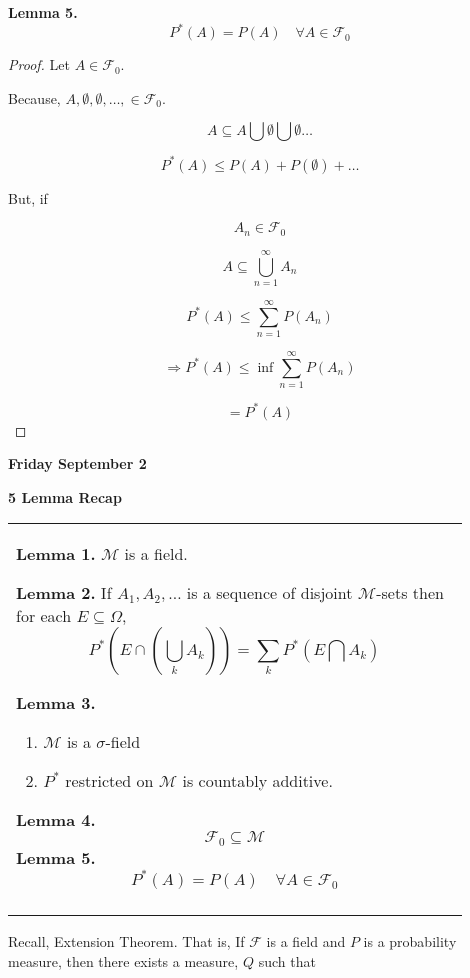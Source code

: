 \documentclass[11pt,fleqn]{book} %
\begin{document}
\textbf{Lemma 5.}$$P^*(A) = P(A) \quad \forall A \in \mathcal{F}_0$$

\begin{proof}
	Let $A \in \mathcal{F}_0$. 

	Because,  $A, \emptyset, \emptyset, \dots, \in \mathcal{F}_0$. 

	$$A \subseteq A \bigcup \emptyset \bigcup \emptyset \dots $$

	$$P^*(A) \leq P(A) + P(\emptyset) + \dots $$

But, if 

$$A_n \in \mathcal{F}_0$$

$$A \subseteq \bigcup^\infty_{n=1} A_n $$

$$P^*(A) \leq \displaystyle \sum^\infty_{n=1} P(A_n)$$

$$\Rightarrow P^*(A) \leq \inf \displaystyle \sum^\infty_{n=1} P(A_n) $$

$$ = P^*(A)$$
\end{proof}

\textbf{Friday September 2}

\begin{remark}
	\textbf{5 Lemma Recap}

	\begin{tabular}{|p{0.9\linewidth}|}\hline %
\rule{0pt}{5ex}%
		
	\textbf{Lemma 1.} $\mathcal{M}$ is a field.

	\textbf{Lemma 2.} If $A_1, A_2, \dots$ is a sequence of disjoint $\mathcal{M}$-sets then for each $E \subseteq \Omega$, 
	$$P^*(E\cap(\bigcup_k A_k)) = \displaystyle \sum_k P^*(E \bigcap A_k) $$

	\textbf{Lemma 3.}
	
	\begin{enumerate}
		\item $\mathcal{M}$ is a $\sigma$-field
		\item $P^*$ restricted on $\mathcal{M}$ is countably additive. 
	\end{enumerate}
	
	\textbf{Lemma 4.} $$\mathcal{F}_0 \subseteq \mathcal{M}$$
	\textbf{Lemma 5.}$$P^*(A) = P(A) \quad \forall A \in \mathcal{F}_0$$
	\text{ }\\
	\\\hline
\end{tabular}
\end{remark}

Recall, Extension Theorem. That is, If $\mathcal{F}$ is a field and $P$ is a probability measure, then there exists a measure, $Q$ such that 
\end{document}

